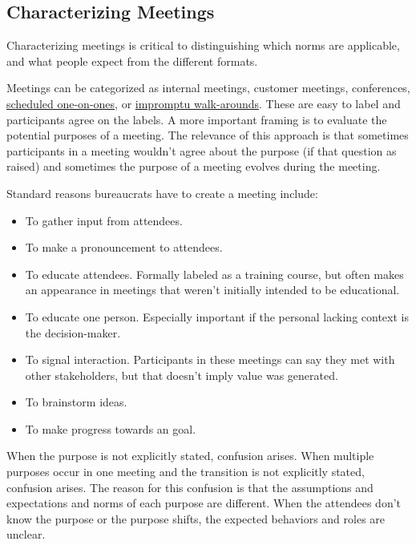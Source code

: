 \subsection*{Characterizing Meetings\label{sec:characterizing-meetings}}
Characterizing meetings is critical to distinguishing which norms are applicable, and what people expect from the different formats. 


Meetings can be categorized as internal meetings, customer meetings, conferences, \hyperref[sec:meetings-one-on-one]{scheduled one-on-ones}\iftoggle{haspagenumbers}{ (see page~\pageref{sec:meetings-one-on-one})}{}, or
\hyperref[sec:walk-arounds]{impromptu walk-arounds}\iftoggle{haspagenumbers}{ (see page~\pageref{sec:walk-arounds})}{}. These are easy to label and participants agree on the labels.
A more important framing is to evaluate the potential purposes of a meeting. The relevance of this approach is that sometimes participants in a meeting wouldn't agree about the purpose (if that question as raised) and sometimes the purpose of a meeting evolves during the meeting. 

Standard reasons bureaucrats have to create a meeting include:
\begin{itemize}
    \item To gather input from attendees.
    \item To make a pronouncement to attendees.
    \item To educate attendees. Formally labeled as a training course, but often makes an appearance in meetings that weren't initially intended to be educational. 
    \item To educate one person. Especially important if the personal lacking context is the decision-maker. 
    \item To signal interaction. Participants in these meetings can say they met with other stakeholders, but that doesn't imply value was generated. 
    \item To brainstorm ideas.
    \item To make progress towards an goal.
\end{itemize}
When the purpose is not explicitly stated, confusion arises. 
When multiple purposes occur in one meeting and the transition is not explicitly stated, confusion arises.
The reason for this confusion is that the assumptions and expectations and norms of each purpose are different. When the attendees don't know the purpose or the purpose shifts, the expected behaviors and roles are unclear. 

